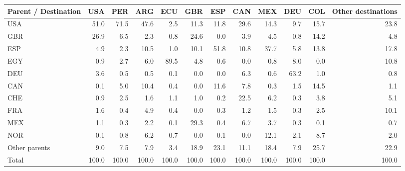 \begin{tabular}{lrrrrrrrrrrr}
\toprule
Parent / Destination & USA & PER & ARG & ECU & GBR & ESP & CAN & MEX & DEU & COL & Other destinations \\
\midrule
USA & 51.0 & 71.5 & 47.6 & 2.5 & 11.3 & 11.8 & 29.6 & 14.3 & 9.7 & 15.7 & 23.8 \\
GBR & 26.9 & 6.5 & 2.3 & 0.8 & 24.6 & 0.0 & 3.9 & 4.5 & 0.8 & 14.2 & 4.8 \\
ESP & 4.9 & 2.3 & 10.5 & 1.0 & 10.1 & 51.8 & 10.8 & 37.7 & 5.8 & 13.8 & 17.8 \\
EGY & 0.9 & 2.7 & 6.0 & 89.5 & 4.8 & 0.6 & 0.0 & 0.8 & 8.0 & 0.0 & 10.8 \\
DEU & 3.6 & 0.5 & 0.5 & 0.1 & 0.0 & 0.0 & 6.3 & 0.6 & 63.2 & 1.0 & 0.8 \\
CAN & 0.1 & 5.0 & 10.4 & 0.4 & 0.0 & 11.6 & 7.8 & 0.3 & 1.5 & 14.5 & 1.1 \\
CHE & 0.9 & 2.5 & 1.6 & 1.1 & 1.0 & 0.2 & 22.5 & 6.2 & 0.3 & 3.8 & 5.1 \\
FRA & 1.6 & 0.4 & 4.9 & 0.4 & 0.0 & 0.3 & 1.2 & 1.5 & 0.3 & 2.5 & 10.1 \\
MEX & 1.1 & 0.3 & 2.2 & 0.1 & 29.3 & 0.4 & 6.7 & 3.7 & 0.3 & 0.1 & 0.7 \\
NOR & 0.1 & 0.8 & 6.2 & 0.7 & 0.0 & 0.1 & 0.0 & 12.1 & 2.1 & 8.7 & 2.0 \\
Other parents & 9.0 & 7.5 & 7.9 & 3.4 & 18.9 & 23.1 & 11.1 & 18.4 & 7.9 & 25.7 & 22.9 \\
\midrule
Total & 100.0 & 100.0 & 100.0 & 100.0 & 100.0 & 100.0 & 100.0 & 100.0 & 100.0 & 100.0 & 100.0 \\
\bottomrule
\end{tabular}
